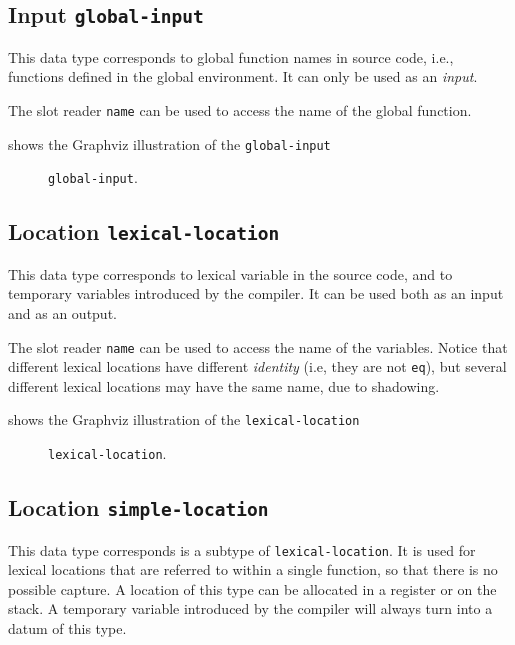 \subsection{Input \texttt{global-input}}

This data type corresponds to global function names in source code,
i.e., functions defined in the global environment.  It can only be
used as an \emph{input}.

The slot reader \texttt{name} can be used to access the name of the
global function.

 shows the Graphviz illustration of the
\texttt{global-input}

\begin{figure}
\begin{center}
\end{center}
\caption{\label{fig-global-input}
\texttt{global-input}.}
\end{figure}

\subsection{Location \texttt{lexical-location}}

This data type corresponds to lexical variable in the source code, and
to temporary variables introduced by the compiler.  It can be used
both as an input and as an output.

The slot reader \texttt{name} can be used to access the name of the
variables.  Notice that different lexical locations have different
\emph{identity} (i.e, they are not \texttt{eq}), but several different
lexical locations may have the same name, due to shadowing.

 shows the Graphviz illustration of the
\texttt{lexical-location}

\begin{figure}
\begin{center}
\end{center}
\caption{\label{fig-lexical-location}
\texttt{lexical-location}.}
\end{figure}

\subsection{Location \texttt{simple-location}}

This data type corresponds is a subtype of \texttt{lexical-location}.
It is used for lexical locations that are referred to within a single
function, so that there is no possible capture.  A location of this
type can be allocated in a register or on the stack.  A temporary
variable introduced by the compiler will always turn into a datum of
this type.

